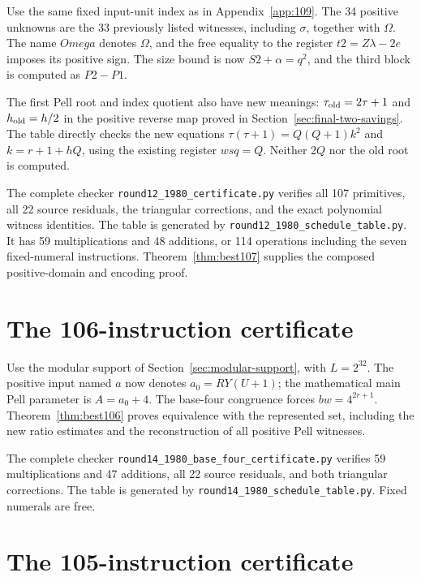 \documentclass[11pt,letterpaper]{article}
\theoremstyle{definition}
\theoremstyle{remark}
\numberwithin{equation}{section}
\newcommand{\file}[1]{\texttt{#1}}
\begin{document}
Use the same fixed input-unit index as in Appendix~\ref{app:109}.
The 34 positive unknowns are the 33 previously listed witnesses,
including $\sigma$, together with $\Omega$. The name
$\mathit{Omega}$ denotes $\Omega$, and the free equality to the
register $\mathit{t2}=Z\lambda-2e$ imposes its positive sign.
The size bound is now $\mathit{S2}+\alpha=q^2$, and the third block is
computed as $\mathit{P2}-\mathit{P1}$.

The first Pell root and index quotient also have new meanings:
$\tau_{\rm old}=2\tau+1$ and $h_{\rm old}=h/2$ in the positive reverse
map proved in Section~\ref{sec:final-two-savings}. The table directly
checks the new equations $\tau(\tau+1)=Q(Q+1)k^2$ and
$k=r+1+hQ$, using the existing register $\mathit{wsq}=Q$.
Neither $2Q$ nor the old root is computed.

The complete checker \file{round12\_1980\_certificate.py} verifies all
107 primitives, all 22 source residuals, the triangular corrections,
and the exact polynomial witness identities. The table is generated by
\file{round12\_1980\_schedule\_table.py}. It has 59 multiplications
and 48 additions, or 114 operations including the seven fixed-numeral
instructions. Theorem~\ref{thm:best107} supplies the composed
positive-domain and encoding proof.

\small


\clearpage\normalsize
\section{The 106-instruction certificate}\label{app:106}

Use the modular support of Section~\ref{sec:modular-support}, with
$L=2^{32}$. The positive input named $a$ now denotes $a_0=RY(U+1)$;
the mathematical main Pell parameter is $A=a_0+4$. The base-four
congruence forces $bw=4^{2r+1}$. Theorem~\ref{thm:best106} proves
equivalence with the represented set, including the new ratio estimates
and the reconstruction of all positive Pell witnesses.

The complete checker
\file{round14\_1980\_base\_four\_certificate.py} verifies 59
multiplications and 47 additions, all 22 source residuals, and both
triangular corrections. The table is generated by
\file{round14\_1980\_schedule\_table.py}. Fixed numerals are free.

\small


\clearpage\normalsize
\section{The 105-instruction certificate}\label{app:105}
\end{document}
